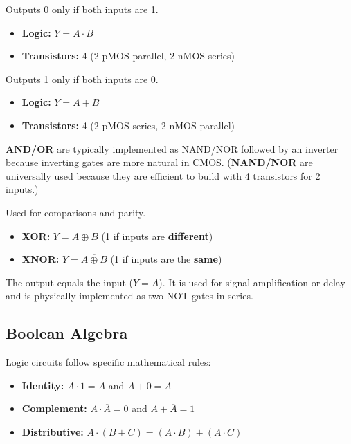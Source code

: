 \begin{definition}
Outputs 0 only if both inputs are 1.
\begin{itemize}
    \item \textbf{Logic:} $Y = \overline{A \cdot B}$
    \item \textbf{Transistors:} 4 (2 pMOS parallel, 2 nMOS series)
\end{itemize}
\end{definition}

\begin{definition}
Outputs 1 only if both inputs are 0.
\begin{itemize}
    \item \textbf{Logic:} $Y = \overline{A + B}$
    \item \textbf{Transistors:} 4 (2 pMOS series, 2 nMOS parallel)
\end{itemize}
\end{definition}

\begin{remark}
\textbf{AND/OR} are typically implemented as NAND/NOR followed by an inverter because inverting gates are more natural in CMOS. (\textbf{NAND/NOR} are universally used because they are efficient to build with 4 transistors for 2 inputs.)
\end{remark}

\begin{remark}
Used for comparisons and parity.
\begin{itemize}
    \item \textbf{XOR:} $Y = A \oplus B$ (1 if inputs are \textbf{different})
    \item \textbf{XNOR:} $Y = \overline{A \oplus B}$ (1 if inputs are the \textbf{same})
\end{itemize}
\end{remark}

\begin{definition}[Buffer]
The output equals the input ($Y = A$). It is used for signal amplification or delay and is physically implemented as two NOT gates in series.
\end{definition}

\subsection{Boolean Algebra}

\begin{definition}
Logic circuits follow specific mathematical rules:
\begin{itemize}
    \item \textbf{Identity:} $A \cdot 1 = A$ and $A + 0 = A$
    \item \textbf{Complement:} $A \cdot \overline{A} = 0$ and $A + \overline{A} = 1$
    \item \textbf{Distributive:} $A \cdot (B + C) = (A \cdot B) + (A \cdot C)$
\end{itemize}
\end{definition}


